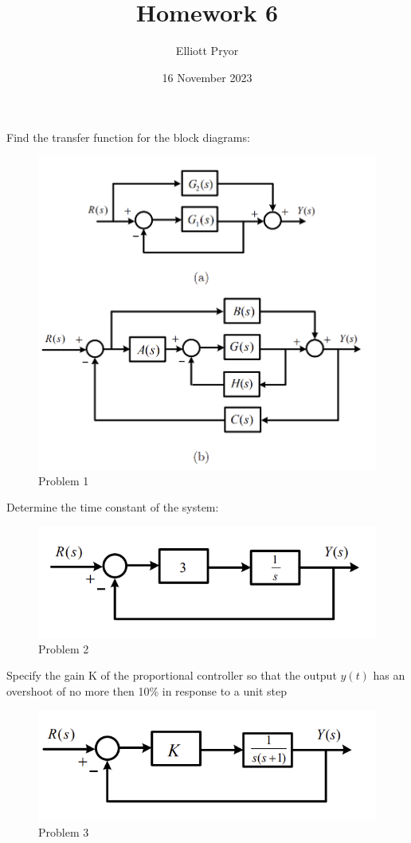 \documentclass[11pt]{article}
\title{Homework 6}
\author{Elliott Pryor}
\date{16 November 2023}
\begin{document}
\maketitle

Find the transfer function for the block diagrams:
\begin{figure}[h] 
    \centering
    \includegraphics[width=0.55 \linewidth]{prob1}
    \caption{Problem 1}
    \label{fig:p1}
\end{figure}

\soln




Determine the time constant of the system:
\begin{figure}[h] 
    \centering
    \includegraphics[width=0.55 \linewidth]{prob2}
    \caption{Problem 2}
    \label{fig:p2}
\end{figure}

\soln




Specify the gain K
of the proportional controller so that the output $y(t)$ has an overshoot of no more then 10\%
in response to a unit step

\begin{figure}[h] 
    \centering
    \includegraphics[width=0.55 \linewidth]{prob3}
    \caption{Problem 3}
    \label{fig:p3}
\end{figure}
\end{document}
